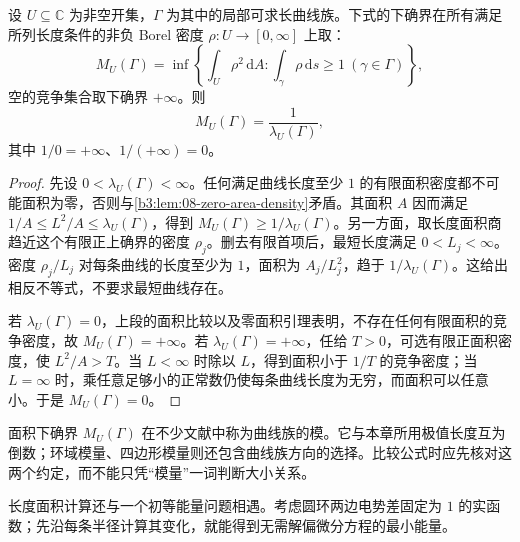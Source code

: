 \begin{proposition}[长度归一化后的面积问题]\label{b3:prop:08-admissible-area}
设 \(U\subseteq\mathbb C\) 为非空开集，\(\Gamma\) 为其中的局部可求长曲线族。下式的下确界在所有满足所列长度条件的非负 Borel 密度 \(\rho:U\rightarrow[0,\infty]\) 上取：
\[
 M_U(\Gamma)=\inf\left\{\int_U\rho^2\,\mathrm dA:
 \int_\gamma\rho\,\mathrm ds\ge1\ (\gamma\in\Gamma)\right\},
\]
空的竞争集合取下确界 \(+\infty\)。则
\[
 M_U(\Gamma)=\frac1{\lambda_U(\Gamma)},
\]
其中 \(1/0=+\infty\)、\(1/(+\infty)=0\)。
\end{proposition}
\begin{proof}
先设 \(0<\lambda_U(\Gamma)<\infty\)。任何满足曲线长度至少 \(1\) 的有限面积密度都不可能面积为零，否则与\cref{b3:lem:08-zero-area-density}矛盾。其面积 \(A\) 因而满足
\(1/A\le L^2/A\le\lambda_U(\Gamma)\)，得到 \(M_U(\Gamma)\ge1/\lambda_U(\Gamma)\)。另一方面，取长度面积商趋近这个有限正上确界的密度 \(\rho_j\)。删去有限首项后，最短长度满足 \(0<L_j<\infty\)。密度 \(\rho_j/L_j\) 对每条曲线的长度至少为 \(1\)，面积为 \(A_j/L_j^2\)，趋于 \(1/\lambda_U(\Gamma)\)。这给出相反不等式，不要求最短曲线存在。

若 \(\lambda_U(\Gamma)=0\)，上段的面积比较以及零面积引理表明，不存在任何有限面积的竞争密度，故 \(M_U(\Gamma)=+\infty\)。若 \(\lambda_U(\Gamma)=+\infty\)，任给 \(T>0\)，可选有限正面积密度，使 \(L^2/A>T\)。当 \(L<\infty\) 时除以 \(L\)，得到面积小于 \(1/T\) 的竞争密度；当 \(L=\infty\) 时，乘任意足够小的正常数仍使每条曲线长度为无穷，而面积可以任意小。于是 \(M_U(\Gamma)=0\)。
\end{proof}
面积下确界 \(M_U(\Gamma)\) 在不少文献中称为曲线族的模。它与本章所用极值长度互为倒数；环域模量、四边形模量则还包含曲线族方向的选择。比较公式时应先核对这两个约定，而不能只凭“模量”一词判断大小关系。

\ProseParagraphBreak
长度面积计算还与一个初等能量问题相遇。考虑圆环两边电势差固定为 \(1\) 的实函数；先沿每条半径计算其变化，就能得到无需解偏微分方程的最小能量。

